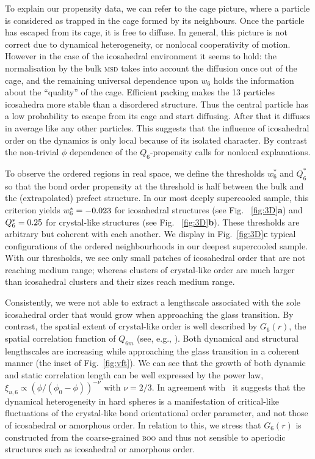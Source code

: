 To explain our propensity data, we can refer to the cage picture, where a particle is considered as trapped in the cage formed by its neighbours. Once the particle has escaped from its cage, it is free to diffuse. In general, this picture is not correct due to dynamical heterogeneity, or nonlocal cooperativity of motion. However in the case of the icosahedral environment it seems to hold: the normalisation by the bulk \textsc{msd} takes into account the diffusion once out of the cage, and the remaining universal dependence upon $w_6$ holds the information about the ``quality'' of the cage. Efficient packing makes the 13 particles icosahedra more stable than a disordered structure. Thus the central particle has a low probability to escape from its cage and start diffusing. After that it diffuses in average like any other particles. This suggests that the influence of icosahedral order on the dynamics is only local because of its isolated character. By contrast the non-trivial $\phi$ dependence of the $Q_6$-propensity calls for nonlocal explanations.

To observe the ordered regions in real space, we define the thresholds $w_6^*$ and $Q_6^*$ so that the bond order propensity at the threshold is half between the bulk and the (extrapolated) prefect structure. In our most deeply supercooled sample, this criterion yields $w_6^* = -0.023$ for icosahedral structures (see Fig. ~\ref{fig:3D}\textbf{a}) and $Q_6^* = 0.25$ for crystal-like structures (see Fig. ~\ref{fig:3D}\textbf{b}). These thresholds are arbitrary but coherent with each another. We display in Fig.~\ref{fig:3D}\textbf{c} typical configurations of the ordered neighbourhoods in our deepest supercooled sample. With our thresholds, we see only small patches of icosahedral order that are not reaching medium range; whereas clusters of crystal-like order are much larger than icosahedral clusters and their sizes reach medium range. 



Consistently, we were not able to extract a lengthscale associated with the sole icosahedral order that would grow when approaching the glass transition. By contrast, the spatial extent of crystal-like order is well described by $G_6(r)$, the spatial correlation function of $Q_{6 m}$ (see, e.g., \cite{tanaka2010critical}). Both dynamical and structural lengthscales are increasing while approaching the glass transition in a coherent manner (the inset of Fig.~\ref{fig:vft}). We can see that the growth of both dynamic and static correlation length can be well expressed by the power law,   $\xi_{u,6} \propto (\phi/(\phi_0-\phi))^{-\nu}$ with $\nu=2/3$. In agreement with~\citep{tanaka2010critical} it suggests that the dynamical heterogeneity in hard spheres is a manifestation of critical-like fluctuations of the crystal-like bond orientational order parameter, and not those of icosahedral or amorphous order. In relation to this, we stress that $G_6(r)$ is constructed from the coarse-grained \textsc{boo} and thus not sensible to aperiodic structures such as icosahedral or amorphous order. 

